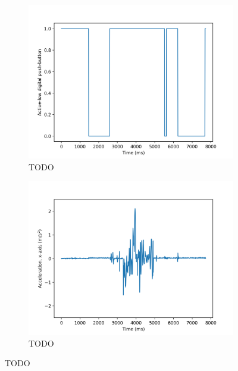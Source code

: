 \documentclass[12pt]{article}
\begin{document}
\begin{figure}[ht]
\centering

\begin{subfigure}[b]{.45\linewidth}
\includegraphics[width=\linewidth]{f0-button.png}
\caption{TODO}
\end{subfigure}
\begin{subfigure}[b]{.45\linewidth}
\includegraphics[width=\linewidth]{f0-acc.png}
\caption{TODO}
\end{subfigure}


\end{figure}
\end{document}

